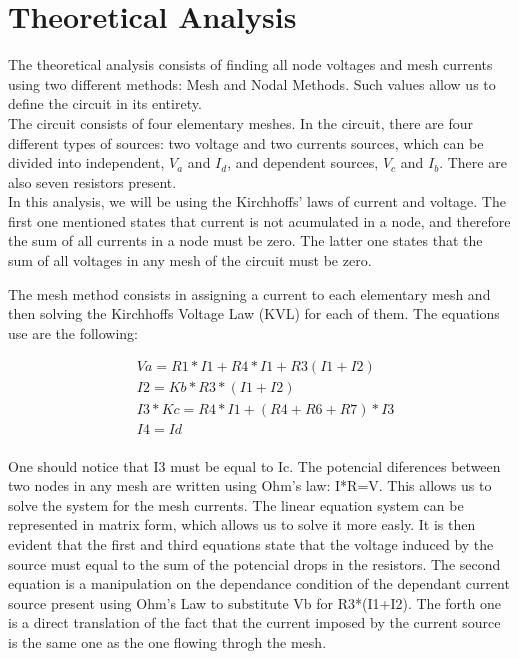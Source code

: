 \section{Theoretical Analysis}
\label{sec:analysis}

\vspace{0.1cm}

The theoretical analysis consists of finding all node voltages and mesh currents using two different methods: Mesh and Nodal Methods. Such values allow us to define the circuit in its entirety.\\

The circuit consists of four elementary meshes. In the circuit, there are four different types of sources: two voltage and two currents sources, which can be divided into independent, $V_a$ and $I_d$, and dependent sources, $V_c$ and $I_b$. There are also seven resistors present.\\
In this analysis, we will be using the Kirchhoffs' laws of current and voltage. The first one mentioned states that current is not acumulated in a node, and therefore the sum of all currents in a node must be zero. The latter one states that the sum of all voltages in any mesh of the circuit must be zero.

\vspace {1cm}
The mesh method consists in assigning a current to each elementary mesh and then solving the Kirchhoffs Voltage Law (KVL) for each of them. The equations use are the following:

\begin{align*} 
 &Va=R1*I1+R4*I1+R3(I1+I2) \\ &I2 = Kb*R3*(I1+I2) \\
 &I3*Kc=R4*I1+(R4+R6+R7)*I3 \\ &I4=Id \\ 
\end{align*}

 
 \vspace{0.5cm}
One should notice that I3 must be equal to Ic. The potencial diferences between two nodes in any mesh are written using Ohm's law: I*R=V. This allows us to solve the system for the mesh currents. The linear equation system can be represented in matrix form, which allows us to solve it more easly. It is then evident that the first and third equations state that the voltage induced by the source must equal to the sum of the potencial drops in the resistors. The second equation is a manipulation on the dependance condition of the dependant current source present using Ohm's Law to substitute Vb for R3*(I1+I2). The forth one is a direct translation of the fact that the current imposed by the current source is the same one as the one flowing throgh the mesh.

